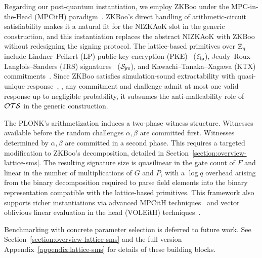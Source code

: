 Regarding our post-quantum instantiation, we employ ZKBoo \cite{USENIX:GiaMadOrl16}
under the MPC-in-the-Head (MPCitH) paradigm~\cite{STOC:IKOS07}.
ZKBoo's direct handling of arithmetic-circuit satisfiability makes it a natural fit
for the NIZKAoK slot in the generic \SMS construction,
and this instantiation replaces the abstract NIZKAoK with ZKBoo
without redesigning the signing protocol.
The lattice-based primitives over $\mathbb{Z}_q$ include
Lindner--Peikert (LP) public-key encryption (PKE)~\cite{RSA:LinPei11} ($\mathcal{E}_{\mathsf{lp}}$),
Jeudy--Roux-Langlois--Sanders (JRS) signatures~\cite{CRYPTO:JeuRouSan23} ($\mathcal{S}_{\mathsf{jrs}}$),
and Kawachi--Tanaka--Xagawa (KTX) commitments~\cite{AC:KawTanXag08}.
Since ZKBoo satisfies simulation-sound extractability with quasi-unique response~\cite{INDOCRYPT:FKMV12},
\ie, any commitment and challenge admit at most one valid response up to negligible probability,
it subsumes the anti-malleability role of $\mathcal{OTS}$ in the generic construction.

The PLONK's arithmetization induces a two-phase witness structure.
Witnesses available before the random challenges $\alpha, \beta$ are committed first.
Witnesses determined by $\alpha, \beta$ are committed in a second phase.
This requires a targeted modification to ZKBoo's decomposition,
detailed in Section~\ref{section:overview-lattice-sms}.
The resulting signature size is quasilinear in the gate count of $F$
and linear in the number of multiplications of $G$ and $P$,
with a $\log q$ overhead arising from the binary decomposition
required to parse field elements into the binary representation
compatible with the lattice-based primitives.
This framework also supports richer instantiations via
advanced MPCitH
techniques~\cite{EC:AGHHJY23,AC:AHJMRY23,PKC:BauNof20,EC:CarCouJou23,CCS:CDGORR17,CCS:KatKolWan18,CCS:DelOrsTan21,CRYPTO:FenJouRiv22}
and vector oblivious linear evaluation in the head (VOLEitH)
techniques~\cite{CRYPTO:BBdSKORS23,ACISP:Bui25,PKC:CLYYYZ24,AC:OTX24}.

Benchmarking with concrete parameter selection is deferred to future work.
See Section~\ref{section:overview-lattice-sms} and
\ifcameraready the full version~\cite{full}
\else Appendix~\ref{appendix:lattice-sms}
\fi for details
of these building blocks.
